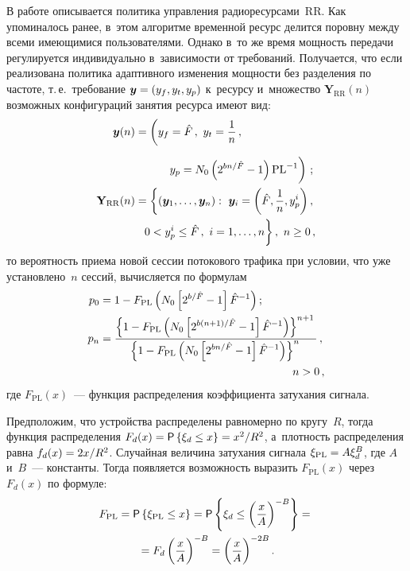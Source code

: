 \begin{multicols}{2}
  В работе описывается политика управления радиоресурсами~RR. Как 
упоминалось ранее, в~этом алгоритме временной ресурс делится поровну между 
всеми имеющимися пользователями. Однако в~то же время мощность передачи 
регулируется индивидуально в~зависимости от требований. Получается, что 
если реализована политика адаптивного изменения мощности без разделения 
по частоте, т.\,е.\ требование $\bm{y}\hm= \left(y_f, y_t, y_p\right)$ к~ресурсу 
и~множество $\mathbf{Y}_{\mathrm{RR}}(n)$ возможных конфигураций 
занятия ресурса имеют вид:
  \begin{align*}
    \bm{y}(n)&= \left( y_f=\hat{F}\,,\ y_t=\fr{1}{n}\,,\right.\\[6pt]
  &\left.\hspace*{10mm}y_p=N_0\left( 
2^{bn/\hat{F}}-1\right)\mathrm{PL}^{-1}
\vphantom{\fr{1}{n}}\right)\,;\\
  \mathbf{Y}_{\mathrm{RR}} (n)&= \left\{ \left( \bm{y}_1, \ldots , 
\bm{y}_n\right):\ \bm{y}_i=\left( \hat{F}, \fr{1}{n}, y_p^i\right),\right.\\
& \left.\hspace*{2mm}0<y_p^i\leq  \hat{F}\,,\ i=1,\ldots , n
\vphantom{\fr{1}{n}}\right\},\ n\geq0\,,
  \end{align*}
то вероятность приема новой сессии потокового трафика при условии, что уже 
установлено~$n$ сессий, вычисляется по формулам
\begin{align*}
p_0&= 1-F_{\mathrm{PL}} \left( N_0 \left[ 2^{b/\hat{F}} -1\right] \hat{F}^{-
1}\right);\\
p_n&= \fr{\left\{ 1-F_{\mathrm{PL}} \left( N_0\left[ 2^{b(n+1)/\hat{F}}-1\right] 
\hat{F}^{-1}\right)\right\}^{n+1}} {\left\{ 1-F_{\mathrm{PL}} \left( N_0\left[ 
2^{bn/\hat{F}}-1\right] \hat{F}^{-1}\right)\right\}^n}\,,\\
&\hspace*{61mm} n>0\,,
\end{align*}
где $F_{\mathrm{PL}}(x)$~--- функция распределения коэффициента затухания 
сигнала. 

  Предположим, что устройства распределены равномерно по кругу~$R$, 
тогда функция распределения $F_d(x)\hm= {\sf P} \left\{ \xi_d\leq x\right\} \hm= 
x^2/R^2$, а~плот\-ность распределения равна $f_d(x)\hm= 2x/R^2$. Случайная 
величина затухания сигнала $\xi_{\mathrm{PL}} \hm= A\xi_d^B$, где $A$ 
и~$B$~--- константы. Тогда появляется возможность выразить 
$F_{\mathrm{PL}}(x)$ через $F_d(x)$ по формуле:
  \begin{multline*}
  F_{\mathrm{PL}} ={\sf P} \left\{ \xi_{\mathrm{PL}}\leq x\right\} ={\sf P} \left\{ 
\xi_d\leq \left( \displaystyle\frac{\displaystyle x\mathstrut}{\displaystyle A\mathstrut}\right)^{-B} \right\} ={}\\
{}=F_d\left( \displaystyle\frac{\displaystyle x\mathstrut}{\displaystyle A\mathstrut}\right)^{-B} = 
\left( \displaystyle\frac{\displaystyle x\mathstrut}{\displaystyle A\mathstrut}\right)^{-2B}.
  \end{multline*}
  

\end{multicols}
